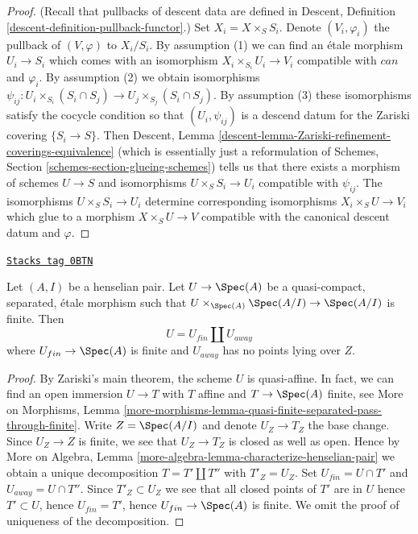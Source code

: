 \begin{proof}
(Recall that pullbacks of descent data are defined in
Descent, Definition \ref{descent-definition-pullback-functor}.)
Set $X_i = X \times_S S_i$. Denote $(V_i, \varphi_i)$ the pullback
of $(V, \varphi)$ to $X_i/S_i$.
By assumption (1) we can find an \'etale morphism $U_i \to S_i$
which comes with an isomorphism $X_i \times_{S_i} U_i \to V_i$ compatible with
$can$ and $\varphi_i$. By assumption (2) we obtain isomorphisms
$\psi_{ij} : U_i \times_{S_i} (S_i \cap S_j) \to
U_j \times_{S_j} (S_i \cap S_j)$.
By assumption (3) these isomorphisms satisfy the cocycle condition
so that $(U_i, \psi_{ij})$ is a descend datum for the
Zariski covering $\{S_i \to S\}$. Then Descent, Lemma
\ref{descent-lemma-Zariski-refinement-coverings-equivalence}
(which is essentially just a reformulation of
Schemes, Section \ref{schemes-section-glueing-schemes})
tells us that there exists a morphism of schemes $U \to S$
and isomorphisms $U \times_S S_i \to U_i$ compatible
with $\psi_{ij}$. The isomorphisms $U \times_S S_i \to U_i$
determine corresponding isomorphisms $X_i \times_S U \to V_i$
which glue to a morphism $X \times_S U \to V$ compatible
with the canonical descent datum and $\varphi$.
\end{proof}

\begin{lemma}
\label{etale-lemma-split-henselian}
\href{https://stacks.math.columbia.edu/tag/0BTN}{\texttt{Stacks tag 0BTN}}

Let $(A, I)$ be a henselian pair. Let $U \to \Spec(A)$ be a
quasi-compact, separated, \'etale morphism such that
$U \times_{\Spec(A)} \Spec(A/I) \to \Spec(A/I)$ is finite.
Then
$$
U = U_{fin} \amalg U_{away}
$$
where $U_{fin} \to \Spec(A)$ is finite and $U_{away}$ has
no points lying over $Z$.
\end{lemma}

\begin{proof}
By Zariski's main theorem, the scheme $U$ is quasi-affine.
In fact, we can find an open immersion $U \to T$ with $T$ affine and
$T \to \Spec(A)$ finite, see More on Morphisms, Lemma
\ref{more-morphisms-lemma-quasi-finite-separated-pass-through-finite}.
Write $Z = \Spec(A/I)$ and denote $U_Z \to T_Z$ the base change.
Since $U_Z \to Z$ is finite, we see that $U_Z \to T_Z$ is closed
as well as open. Hence by
More on Algebra, Lemma \ref{more-algebra-lemma-characterize-henselian-pair}
we obtain a unique decomposition $T = T' \amalg T''$ with $T'_Z = U_Z$.
Set $U_{fin} = U \cap T'$ and $U_{away} = U \cap T''$. Since
$T'_Z \subset U_Z$ we see that all closed points of $T'$ are in $U$
hence $T' \subset U$, hence $U_{fin} = T'$, hence $U_{fin} \to \Spec(A)$
is finite. We omit the proof
of uniqueness of the decomposition.
\end{proof}

